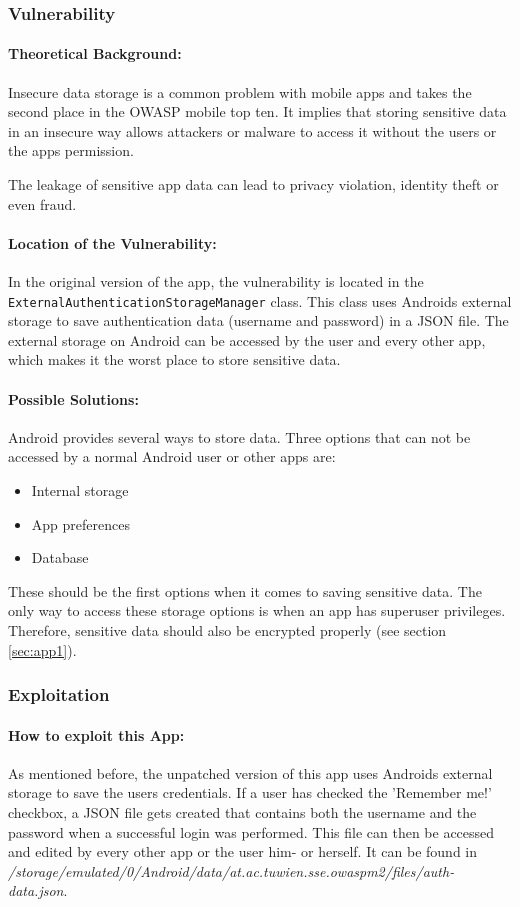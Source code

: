 \subsubsection{Vulnerability}
\paragraph{Theoretical Background:}
Insecure data storage is a common problem with mobile apps and takes the second place in the OWASP mobile top ten. It implies that storing sensitive data in an insecure way allows attackers or malware to access it without the users or the apps permission.

The leakage of sensitive app data can lead to privacy violation, identity theft or even fraud.

\paragraph{Location of the Vulnerability:} 
In the original version of the app, the vulnerability is located in the \texttt{ExternalAuthenticationStorageManager} class. This class uses Androids external storage to save authentication data (username and password) in a JSON file. The external storage on Android can be accessed by the user and every other app, which makes it the worst place to store sensitive data.

\paragraph{Possible Solutions:} Android provides several ways to store data. Three options that can not be accessed by a normal Android user or other apps are:
\begin{itemize}
	\item Internal storage
	\item App preferences
	\item Database
\end{itemize}
These should be the first options when it comes to saving sensitive data. The only way to access these storage options is when an app has superuser privileges. Therefore, sensitive data should also be encrypted properly (see section \ref{sec:app1}).


\subsubsection{Exploitation}
\paragraph{How to exploit this App:}
As mentioned before, the unpatched version of this app uses Androids external storage to save the users credentials. If a user has checked the 'Remember me!' checkbox, a JSON file gets created that contains both the username and the password when a successful login was performed. This file can then be accessed and edited by every other app or the user him- or herself. It can be found in \textit{/storage/emulated/0/Android/data/at.ac.tuwien.sse.owaspm2/files/auth-data.json}.

